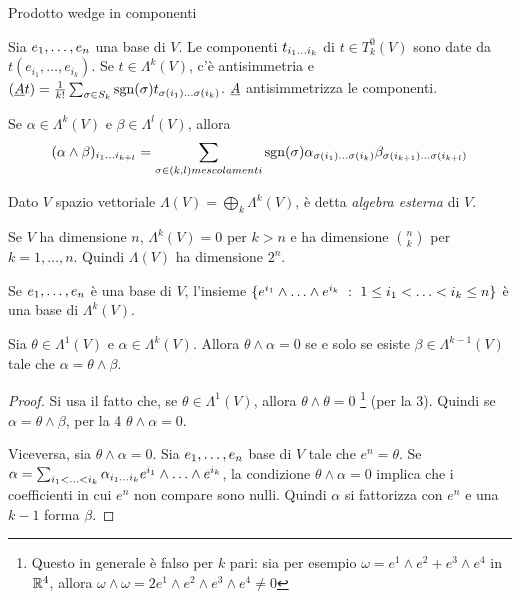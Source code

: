 Prodotto wedge in componenti

Sia $\seqb en,$ una base di $V$. Le componenti $t_{\seqb ik{}}$ di $t\in T^0_k(V)$ sono date da $t(e_{i_1},\ldots,e_{i_k})$.
Se $t\in\Lambda^k(V)$, c'è antisimmetria e $(\antisimm t) = \frac 1{k!} \sum_{\sigma\in S_k} \sgn(\sigma) t_{\sigma(i_1)\ldots\sigma(i_k)}$. $\antisimm$ antisimmetrizza le componenti.

Se $\alpha\in\Lambda^k(V)$ e $\beta\in\Lambda^l(V)$, allora
\begin{equation*}
	(\alpha\wedge\beta)_{\seqb{i}{k+l}{}} = \sum_{\sigma\in(k,l) mescolamenti} \sgn(\sigma) \alpha_{\sigma(i_1)\ldots\sigma(i_k)} \beta_{\sigma(i_{k+1})\ldots\sigma(i_{k+l})}
\end{equation*}

\begin{definition}
	Dato $V$ spazio vettoriale $\Lambda(V)=\bigoplus_k\Lambda^k(V)$, è detta \emph{algebra esterna} di $V$.
\end{definition}

\begin{proposition}
	Se $V$ ha dimensione $n$, $\Lambda^k(V)=0$ per $k>n$ e ha dimensione $\binom nk$ per $k=1,\ldots,n$. Quindi $\Lambda(V)$ ha dimensione $2^n$.
	
	Se $\seqb en,$ è una base di $V$, l'insieme $\{ e^{i_1}\wedge\ldots\wedge e^{i_k} \suchthat 1\le i_1< \ldots < i_k\le n\}$ è una base di $\Lambda^k(V)$.
\end{proposition}

\begin{corollary}
	Sia $\theta\in\Lambda^1(V)$ e $\alpha\in\Lambda^k(V)$. Allora $\theta\wedge\alpha=0$ se e solo se esiste $\beta\in\Lambda^{k-1}(V)$ tale che $\alpha = \theta \wedge \beta$.
\end{corollary}
\begin{proof}
	Si usa il fatto che, se $\theta\in\Lambda^1(V)$, allora $\theta\wedge\theta=0$ \footnote{Questo in generale è falso per $k$ pari: sia per esempio $\omega=e^1\wedge e^2+e^3\wedge e^4$ in $\R^4$, allora $\omega\wedge\omega = 2e^1\wedge e^2 \wedge e^3\wedge e^4 \not=0$} (per la 3).
	Quindi se $\alpha=\theta\wedge\beta$, per la 4 $\theta\wedge\alpha=0$.
	
	Viceversa, sia $\theta\wedge\alpha=0$. Sia $\seqb en,$ base di $V$ tale che $e^n=\theta$. Se $\alpha=\sum_{i_1<\ldots<i_k} \alpha_{\seqb ik{}} e^{i_1}\wedge\ldots\wedge e^{i_k}$, la condizione $\theta\wedge\alpha=0$ implica che i coefficienti in cui $e^n$ non compare sono nulli. Quindi $\alpha$ si fattorizza con $e^n$ e una $k-1$ forma $\beta$.
\end{proof}

